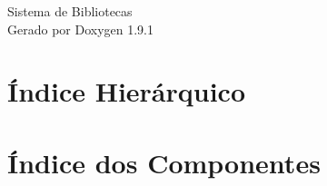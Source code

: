 \let\mypdfximage\pdfximage\def\pdfximage{\immediate\mypdfximage}\documentclass[twoside]{book}
\newcommand{\+}{\discretionary{\mbox{\scriptsize$\hookleftarrow$}}{}{}}
\newcommand{\clearemptydoublepage}{%
  \newpage{\pagestyle{empty}\cleardoublepage}%
}
\begin{document}
\raggedbottom

\hypersetup{pageanchor=false,
             bookmarksnumbered=true,
             pdfencoding=unicode
            }
\begin{titlepage}
\vspace*{7cm}
\begin{center}%
{\Large Sistema de Bibliotecas }\\
\vspace*{1cm}
{\large Gerado por Doxygen 1.9.1}\\
\end{center}
\end{titlepage}
\clearemptydoublepage
{}
\tableofcontents
\clearemptydoublepage
{}
\hypersetup{pageanchor=true}

\chapter{Índice Hierárquico}

\chapter{Índice dos Componentes}

\end{document}
